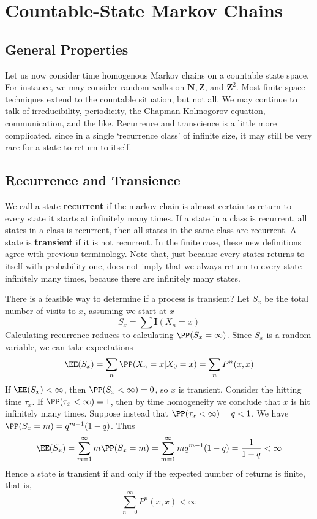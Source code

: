 \chapter{Countable-State Markov Chains}

\section{General Properties}

Let us now consider time homogenous Markov chains on a countable state space. For instance, we may consider random walks on $\mathbf{N}, \mathbf{Z}$, and $\mathbf{Z}^2$. Most finite space techniques extend to the countable situation, but not all. We may continue to talk of irreducibility, periodicity, the Chapman Kolmogorov equation, communication, and the like. Recurrence and transcience is a little more complicated, since in a single `recurrence class' of infinite size, it may still be very rare for a state to return to itself.

\section{Recurrence and Transience}

We call a state {\bf recurrent} if the markov chain is almost certain to return to every state it starts at infinitely many times. If a state in a class is recurrent, all states in a class is recurrent, then all states in the same class are recurrent. A state is {\bf transient} if it is not recurrent. In the finite case, these new definitions agree with previous terminology. Note that, just because every states returns to itself with probability one, does not imply that we always return to every state infinitely many times, because there are infinitely many states.

There is a feasible way to determine if a process is transient? Let $S_x$ be the total number of visits to $x$, assuming we start at $x$
%
\[ S_x = \sum \mathbf{I}(X_n = x) \]
%
Calculating recurrence reduces to calculating $\PP(S_x = \infty)$. Since $S_x$ is a random variable, we can take expectations
%
\[ \EE(S_x) = \sum_n \PP(X_n = x | X_0 = x) = \sum_n P^n(x,x) \]
%
If $\EE(S_x) < \infty$, then $\PP(S_x < \infty) = 0$, so $x$ is transient. Consider the hitting time $\tau_x$. If $\PP(\tau_x < \infty) = 1$, then by time homogeneity we conclude that $x$ is hit infinitely many times. Suppose instead that $\PP(\tau_x < \infty) = q < 1$. We have $\PP(S_x = m) = q^{m-1}(1-q)$. Thus
%
\[ \EE(S_x) = \sum_{m = 1}^\infty m \PP(S_x = m) = \sum_{m = 1}^\infty mq^{m-1}(1 - q) = \frac{1}{1-q} < \infty \]
%
Hence a state is transient if and only if the expected number of returns is finite, that is,
%
\[ \sum_{n = 0}^\infty P^n(x,x) < \infty \]

